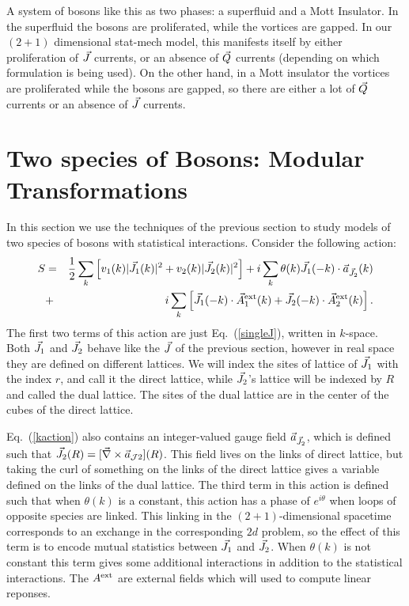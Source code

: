 A system of bosons like this as two phases: a superfluid and a Mott Insulator. In the superfluid the bosons are proliferated, while the vortices are gapped. In our $(2+1)$ dimensional stat-mech model, this manifests itself by either proliferation of $\vec{J}$ currents, or an absence of $\vec{Q}$ currents (depending on which formulation is being used). On the other hand, in a Mott insulator the vortices are proliferated while the bosons are gapped, so there are either a lot of $\vec{Q}$ currents or an absence of $\vec{J}$ currents.

\section{Two species of Bosons: Modular Transformations}
In this section we use the techniques of the previous section to study models of two species of bosons with statistical interactions.\cite{short_range3,Gen2Loops,FQHE} Consider the following action:
\begin{eqnarray}
S&=&\frac{1}{2}\sum_k \left[v_1(k)|\vec{J}_1(k)|^2+v_2(k)|\vec{J}_2(k)|^2\right]
+i\sum_k \theta(k)\vec{J}_1(-k)\cdot \vec{a}_{\vec{J}_2}(k)\nonumber\\
&+&i\sum_k \left[ \vec{J}_1(-k)\cdot \vec{A}_{1}^{\rm ext}(k) + \vec{J}_2(-k)\cdot \vec{A}_{2}^{\rm ext}(k) \right].
\label{kaction}
\end{eqnarray}
The first two terms of this action are just Eq.~(\ref{singleJ}), written in $k$-space. Both $\vec{J}_1$ and $\vec{J}_2$ behave like the $\vec{J}$ of the previous section, however in real space they are defined on different lattices. We will index the sites of lattice of $\vec{J}_1$ with the index $r$, and call it the direct lattice, while $\vec{J}_2$'s lattice will be indexed by $R$ and called the dual lattice. The sites of the dual lattice are in the center of the cubes of the direct lattice.\

Eq.~(\ref{kaction}) also contains an integer-valued gauge field $\vec{a}_{\vec{J}_2}$, which is defined such that $\vec{J}_2(R)=[\vec{\nabla}\times\vec{a}_{\mathcal{J}2}](R)$. This field lives on the links of direct lattice, but taking the curl of something on the links of the direct lattice gives a variable defined on the links of the dual lattice. The third term in this action is defined such that when $\theta(k)$ is a constant, this action has a phase of $e^{i\theta}$ when loops of opposite species are linked. This linking in the $(2+1)$-dimensional spacetime corresponds to an exchange in the corresponding $2d$ problem, so the effect of this term is to encode mutual statistics between $\vec{J}_1$ and $\vec{J}_2$. When $\theta(k)$ is not constant this term gives some additional interactions in addition to the statistical interactions. The $A^{\rm ext}$ are external fields which will used to compute linear reponses.

